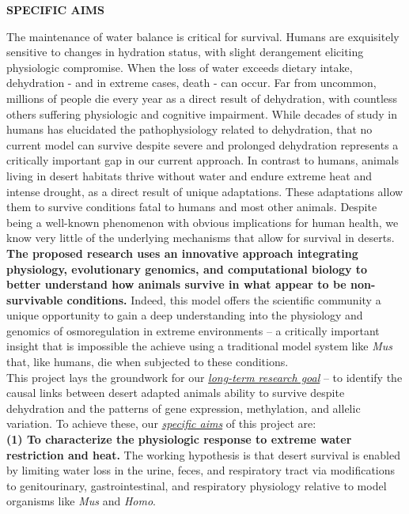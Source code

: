 \documentclass[11pt]{article}
\begin{document}

\pagestyle{empty}

\noindent \textbf{SPECIFIC AIMS}

\noindent The maintenance of water balance is critical for survival. Humans are exquisitely sensitive to changes in hydration status, with slight derangement eliciting physiologic compromise. When the loss of water exceeds dietary intake, dehydration - and in extreme cases, death - can occur. Far from uncommon, millions of people die every year as a direct result of dehydration, with countless others suffering physiologic and cognitive impairment. While decades of study in humans has elucidated the pathophysiology related to dehydration, that no current model can survive despite severe and prolonged dehydration represents a critically important gap in our current approach. In contrast to humans, animals living in desert habitats thrive without water and endure extreme heat and intense drought, as a direct result of unique adaptations. These adaptations allow them to survive conditions fatal to humans and most other animals. Despite being a well-known phenomenon with obvious implications for human health, we know very little of the underlying mechanisms that allow for survival in deserts. \textbf{The proposed research uses an innovative approach integrating physiology, evolutionary genomics, and computational biology to better understand how animals survive in what appear to be non-survivable conditions.} Indeed, this model offers the scientific community a unique opportunity to gain a deep understanding into the physiology and genomics of osmoregulation in extreme environments – a critically important insight that is impossible the achieve using a traditional model system like \textit{Mus} that, like humans, die when subjected to these conditions. \\

\noindent  This project lays the groundwork for our \ul{\emph{long-term research goal}} – to identify the causal links between desert adapted animals ability to survive despite dehydration and the patterns of gene expression, methylation, and allelic variation. To achieve these, our \ul{\emph{specific aims}} of this project are:\\

\noindent \textbf{(1) To characterize the physiologic response to extreme water restriction and heat.} The working hypothesis is that desert survival is enabled by limiting water loss in the urine, feces, and respiratory tract via modifications to genitourinary, gastrointestinal, and respiratory physiology relative to model organisms like \textit{Mus} and \textit{Homo}.  \\
\end{document}
